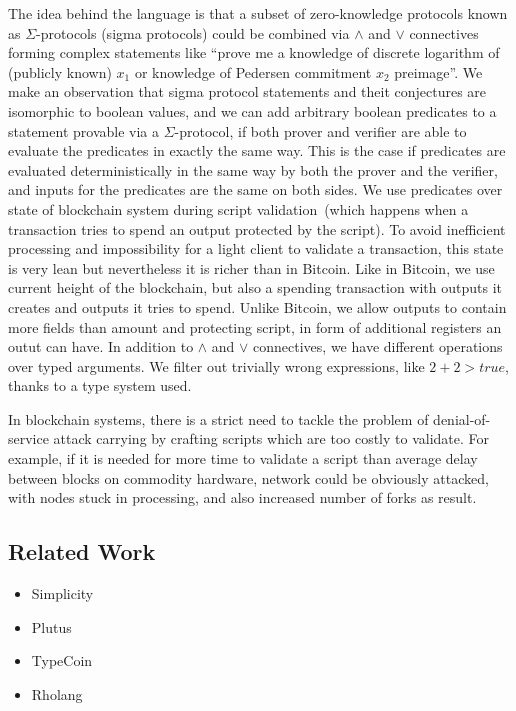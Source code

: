 \documentclass[]{llncs}
\newcommand{\authnote}[2]{\marginpar{\parbox{\marginparwidth}{\tiny %
  \textsf{#1 {\textcolor{blue}{notes: #2}}}}}%
  \textcolor{blue}{\textbf{\dag}}}
\newcommand{\authnote}[2]{
  \textsf{#1 \textcolor{blue}{: #2}}}
\newcommand{\authnote}[2]{}
\newcommand{\knote}[1]{{\authnote{\textcolor{green}{kushti notes}}{#1}}}
\begin{document}
The idea behind the language is that a subset of zero-knowledge protocols known as $\Sigma$-protocols (sigma protocols) could be combined via $\land$ and $\lor$ connectives forming complex statements like ``prove me a knowledge of discrete logarithm of (publicly known) $x_1$ or knowledge of Pedersen commitment $x_2$ preimage''. We make an observation that sigma protocol statements and theit conjectures are isomorphic to boolean values, and we can add arbitrary boolean predicates to a statement provable via a $\Sigma$-protocol, if both prover and verifier are able to evaluate the predicates in exactly the same way. This is the case if predicates are evaluated deterministically in the same way by both the prover and the verifier, and inputs for the predicates are the same on both sides. We use predicates over state of blockchain system during script validation~(which happens when a transaction tries to spend an output protected by the script). To avoid inefficient processing and impossibility for a light client to validate a transaction, this state is very lean but nevertheless it is richer than in Bitcoin. Like in Bitcoin, we use current height of the blockchain, but also a spending transaction with outputs it creates and outputs it tries to spend. Unlike Bitcoin, we allow outputs to contain more fields than amount and protecting script, in form of additional registers an outut can have. In addition to $\land$ and $\lor$ connectives, we have different operations over typed arguments. We filter out trivially wrong expressions, like $2 + 2 > true$, thanks to a type system used. 

In blockchain systems, there is a strict need to tackle the problem of denial-of-service attack carrying by crafting scripts which are too costly to validate. For example, if it is needed for more time to validate a script than average delay between blocks on commodity hardware, network could be obviously attacked, with nodes stuck in processing, and also increased number of forks as result. 


\subsection{Related Work}

\knote{A good survey is available at https://arxiv.org/pdf/1801.00687.pdf, pg. 11}

\begin{itemize}
    \item{Simplicity}
    \item{Plutus}
    \item{TypeCoin}
    \item{Rholang}
\end{itemize}
\end{document}
